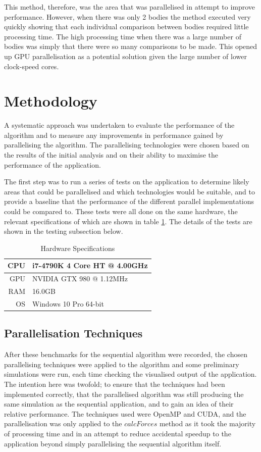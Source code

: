\documentclass[12pt,journal,transmag]{IEEEtran}
\begin{document}
	This method, therefore, was the area that was parallelised in attempt to improve performance. However, when there was only 2 bodies the method executed very quickly showing that each individual comparison between bodies required little processing time. The high processing time when there was a large number of bodies was simply that there were so many comparisons to be made. This opened up GPU parallelisation as a potential solution given the large number of lower clock-speed cores.
	
	\section{Methodology}
	
	A systematic approach was undertaken to evaluate the performance of the algorithm and to measure any improvements in performance gained by parallelising the algorithm. The parallelising technologies were chosen based on the results of the initial analysis and on their ability to maximise the performance of the application.
	
	The first step was to run a series of tests on the application to determine likely areas that could be parallelised and which technologies would be suitable, and to provide a baseline that the performance of the different parallel implementations could be compared to. These tests were all done on the same hardware, the relevant specifications of which are shown in table \ref{hardware}. The details of the tests are shown in the testing subsection below.
	
	\begin{table}[!h]
		\renewcommand{\arraystretch}{1.3}
		\caption{Hardware Specifications}
		\label{hardware}
		\centering
		\begin{tabular}{r|l}
			\toprule
			CPU & i7-4790K 4 Core HT @ 4.00GHz\\ \hline
			GPU & NVIDIA GTX 980 @ 1.12MHz \\ \hline
			RAM & 16.0GB\\ \hline
			OS & Windows 10 Pro 64-bit\\ \bottomrule
		\end{tabular}
	\end{table}
	
	\subsection{Parallelisation Techniques}
	After these benchmarks for the sequential algorithm were recorded, the chosen parallelising techniques were applied to the algorithm and some preliminary simulations were run, each time checking the visualised output of the application. The intention here was twofold; to ensure that the techniques had been implemented correctly, that the parallelised algorithm was still producing the same simulation as the sequential application, and to gain an idea of their relative performance. The techniques used were OpenMP and CUDA, and the parallelisation was only applied to the $calcForces$ method as it took the majority of processing time and in an attempt to reduce accidental speedup to the application beyond simply parallelising the sequential algorithm itself.
	
\end{document}
